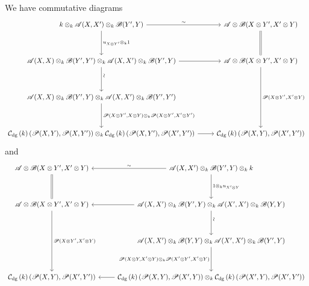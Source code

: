\documentclass[dissertation.tex]{subfiles}
\begin{document}
        We have commutative diagrams
        $$
        \begin{tikzcd}
          k \otimes_k \A(X,X^\prime) \otimes_k \B(Y^\prime, Y) \arrow{r}{\sim}\arrow{dd}{u_{X \otimes Y^\prime} \otimes_k 1} & \A \otimes \B(X \otimes Y^\prime,X^\prime \otimes Y) \arrow[equals]{dd}\\
          \\
          \A(X,X) \otimes_k \B(Y^\prime, Y^\prime) \otimes_k \A(X,X^\prime) \otimes_k \B(Y^\prime, Y)\arrow{r} \arrow{dd}[rotate=90,yshift=-1ex]{\sim} & \A \otimes \B(X \otimes Y^\prime,X^\prime \otimes Y) \arrow{dddd}{\funct{P}(X \otimes Y^\prime, X^\prime \otimes Y)}\\
          \\
          \A(X,X) \otimes_k \B(Y^\prime, Y) \otimes_k \A(X,X^\prime) \otimes_k \B(Y^\prime, Y^\prime)\arrow{dd}{\funct{P}(X \otimes Y^\prime, X \otimes Y) \otimes_k \funct{P}(X \otimes Y^\prime, X^\prime \otimes Y^\prime)} \\
          \\
          \cdg{k}(\funct{P}(X,Y), \funct{P}(X,Y^\prime)) \otimes_k \cdg{k}(\funct{P}(X,Y^\prime),\funct{P}(X^\prime, Y^\prime))\arrow{r} & \cdg{k}(\funct{P}(X,Y), \funct{P}(X^\prime, Y^\prime)) 
        \end{tikzcd}
        $$
        and
        $$
        \begin{tikzcd}
          \A \otimes \B(X \otimes Y^\prime,X^\prime \otimes Y) \arrow[equals]{dd} & \A(X,X^\prime) \otimes_k \B(Y^\prime, Y)  \otimes_k k\arrow[swap]{l}{\sim}\arrow{dd}{1 \otimes_k u_{X^\prime \otimes Y}}\\
          \\
          \A \otimes \B(X \otimes Y^\prime,X^\prime \otimes Y) \arrow{dddd}{\funct{P}(X \otimes Y^\prime, X^\prime \otimes Y)}  & \A(X,X^\prime) \otimes_k \B(Y^\prime, Y) \otimes_k \A(X^\prime, X^\prime) \otimes_k \B(Y,Y)\arrow{l}\arrow{dd}[rotate=90,yshift=-1ex]{\sim}\\
          \\
          & \A(X,X^\prime) \otimes_k \B(Y,Y) \otimes_k \A(X^\prime, X^\prime) \otimes_k \B(Y^\prime, Y)\arrow[swap]{dd}{\funct{P}(X \otimes Y, X^\prime \otimes Y) \otimes_k \funct{P}(X^\prime \otimes Y^\prime, X^\prime \otimes Y)}\\
          \\
          \cdg{k}(\funct{P}(X,Y), \funct{P}(X^\prime, Y^\prime)) & \cdg{k}(\funct{P}(X,Y), \funct{P}(X^\prime, Y)) \otimes_k \cdg{k}(\funct{P}(X^\prime,Y), \funct{P}(X^\prime, Y^\prime))\arrow{l}
        \end{tikzcd}
        $$
\end{document}
